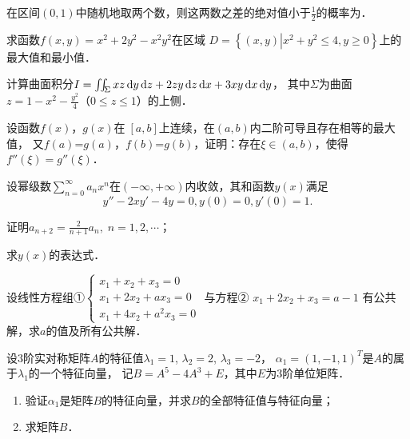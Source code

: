 \documentclass[plain,noanswer,medmath]{../../template/jnuexam}
\begin{document}
\begin{problem}
在区间$(0,1)$中随机地取两个数，则这两数之差的绝对值小于$\frac{1}{2}$的概率为\fillin{}．
\end{problem}




\begin{problem}[points=10]
求函数$f(x,y) = x^2 + 2y^2 - x^2y^2$在区域
$D = \left\{(x,y)\left| x^2 + y^2 \le 4,y \ge 0 \right. \right\}$上的最大值和最小值．
\end{problem}


\begin{problem}[points=11]
计算曲面积分$I = \iint_{\Sigma}xz\mathop{}\!\mathrm{d} y\mathop{}\!\mathrm{d} z + 2zy\mathop{}\!\mathrm{d} z\mathop{}\!\mathrm{d} x + 3xy \mathop{}\!\mathrm{d} x\mathop{}\!\mathrm{d} y$，
其中$\Sigma$为曲面$z = 1 - x^2 - \frac{y^2}{4}$（$0 \le z \le 1$）的上侧．
\end{problem}


\begin{problem}[points=11]
设函数$f(x)$，$g(x)$在$\;\left[a,b \right]$上连续，在$(a,b)$内二阶可导且存在相等的最大值，
又$f(a)$=$g(a)$，$f(b)$=$g(b)$，证明：存在$\xi \in(a,b)$，使得$f''(\xi) = g''(\xi)$．
\end{problem}


\begin{problem}[points=10]
设幂级数$\sum_{n = 0}^{\infty}a_n x^n$在$(-\infty , +\infty)$内收敛，其和函数$y(x)$满足
$$y'' - 2xy' - 4y = 0,y(0) = 0,y'(0) = 1.$$
\begin{enumerate*}
  \item 证明$a_{n + 2} = \frac{2}{n + 1}a_n,\;n = 1,2, \cdots$；
  \item 求$y(x)$的表达式．
\end{enumerate*}
\end{problem}

\begin{problem}[points=11]
设线性方程组①$\begin{cases}
  x_1 + x_2 + x_3 = 0 \\
  x_1 + 2x_2 + ax_3 = 0 \\
  x_1 + 4x_2 + a^2x_3 = 0
\end{cases}$
与方程②       $x_1 + 2x_2 + x_3 = a - 1$
有公共解，求$a$的值及所有公共解．
\end{problem}


\begin{problem}[points=11]
设$3$阶实对称矩阵$A$的特征值$\lambda_1 = 1$, $\lambda_2 = 2$, $\lambda_3 = - 2$，
$\alpha_1 = (1, - 1,1)^T$是$A$的属于$\lambda_1$的一个特征向量，
记$B = A^5 - 4A^3 + E$，其中$E$为$3$阶单位矩阵．
\begin{enumerate}
  \item 验证$\alpha_1$是矩阵$B$的特征向量，并求$B$的全部特征值与特征向量；
  \item 求矩阵$B$．
\end{enumerate}
\end{problem}
\end{document}
